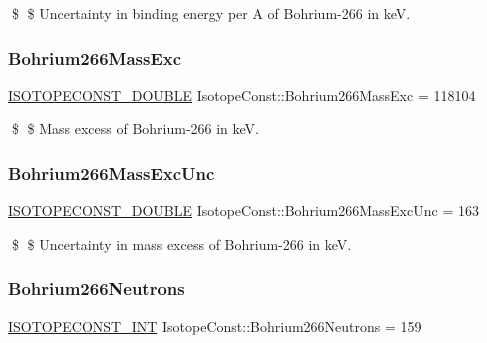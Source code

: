 \$ \$ Uncertainty in binding energy per A of Bohrium-\/266 in keV. \mbox{\label{group___isotope_const-_bohrium-_bh266_ga57148c72d0dfb9fb255469416a10c8c5}} 
\subsubsection{\texorpdfstring{Bohrium266\+Mass\+Exc}{Bohrium266MassExc}}
{\footnotesize\ttfamily \mbox{\hyperlink{group___isotope_const-_macros_ga8f45a7272ce02c0b4c65c44636ed719a}{I\+S\+O\+T\+O\+P\+E\+C\+O\+N\+S\+T\+\_\+\+D\+O\+U\+B\+LE}} Isotope\+Const\+::\+Bohrium266\+Mass\+Exc = 118104}

\$ \$ Mass excess of Bohrium-\/266 in keV. \mbox{\label{group___isotope_const-_bohrium-_bh266_ga10026c4909598cffda3a2183a3d76df8}} 
\subsubsection{\texorpdfstring{Bohrium266\+Mass\+Exc\+Unc}{Bohrium266MassExcUnc}}
{\footnotesize\ttfamily \mbox{\hyperlink{group___isotope_const-_macros_ga8f45a7272ce02c0b4c65c44636ed719a}{I\+S\+O\+T\+O\+P\+E\+C\+O\+N\+S\+T\+\_\+\+D\+O\+U\+B\+LE}} Isotope\+Const\+::\+Bohrium266\+Mass\+Exc\+Unc = 163}

\$ \$ Uncertainty in mass excess of Bohrium-\/266 in keV. \mbox{\label{group___isotope_const-_bohrium-_bh266_gaa90f5db3154036344c1fcf1f29400d0d}} 
\subsubsection{\texorpdfstring{Bohrium266\+Neutrons}{Bohrium266Neutrons}}
{\footnotesize\ttfamily \mbox{\hyperlink{group___isotope_const-_macros_ga5f18360b3e99483a35c32d789e62621c}{I\+S\+O\+T\+O\+P\+E\+C\+O\+N\+S\+T\+\_\+\+I\+NT}} Isotope\+Const\+::\+Bohrium266\+Neutrons = 159}

